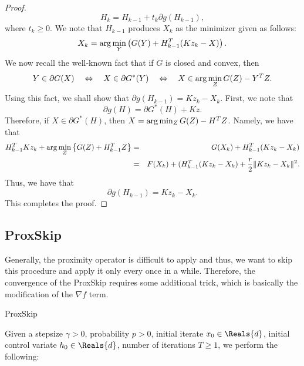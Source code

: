\begin{itemize}
\begin{proof}
\begin{equation} 
H_k = H_{k-1} + t_k \partial g(H_{k-1}), 
\end{equation} 
where $t_k \geq 0$. We note that $H_{k-1}$ produces $X_k$ as the minimizer given as follows: 
\begin{equation} 
X_k = {\rm arg}\min_Y \left ( G(Y) + H_{k-1}^T (K z_k - X) \right ).  
\end{equation} 
We now recall the well-known fact that if $G$ is closed and convex, then 
\begin{equation}
Y \in \partial G(X) \quad \Leftrightarrow \quad X \in \partial G^*(Y) \quad \Leftrightarrow \quad X \in {\rm arg}\min_Z G(Z) - Y^T Z.
\end{equation}
Using this fact, we shall show that $\partial g(H_{k-1}) = Kz_k - X_k$. First, we note that 
\begin{equation}
\partial g(H) = \partial G^*(H) + Kz. 
\end{equation}
Therefore,  if $X \in \partial G^*(H)$, then $X = {\rm arg}\min_Z G(Z) - H^TZ$. Namely, we have that 
\begin{eqnarray*}
H_{k-1}^T Kz_k + {\rm arg}\min_Z \left \{ G(Z) + H_{k-1}^T Z \right \} &=& G(X_k) + H_{k-1}^T (Kz_k - X_k) \\
&=& F(X_k) + (H_{k-1}^T (Kz_k - X_k) + \frac{r}{2}\|Kz_k - X_k\|^2. 
\end{eqnarray*}
Thus, we have that
\begin{equation}
\partial g(H_{k-1}) = Kz_k - X_k. 
\end{equation}
This completes the proof. 
\end{proof} 

\newpage 
\subsection{ProxSkip} 
Generally, the proximity operator is difficult to apply and thus, we want to skip this procedure and apply it only every once in a while. Therefore, the convergence of the ProxSkip requires some additional trick, which is basically the modification of the $\nabla f$ term. 

\begin{algorithm}
\caption{ProxSkip}\label{alg:mainskip}
Given a stepsize $\gamma > 0$, probability $p > 0$, initial iterate $x_0 \in \Reals{d}$, initial control variate $h_0 \in \Reals{d}$, number of iterations $T \geq 1$, we perform the following:  
\begin{algorithmic}


\end{algorithmic}
\end{algorithm}
\end{itemize}
